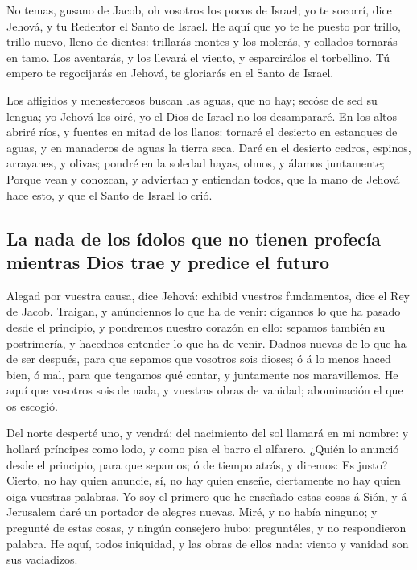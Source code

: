  No temas, gusano de Jacob, oh vosotros los pocos de
Israel; yo te socorrí, dice Jehová, y tu Redentor el Santo de Israel.
 He aquí que yo te he puesto por trillo, trillo nuevo,
lleno de dientes: trillarás montes y los molerás, y collados tornarás en
tamo.  Los aventarás, y los llevará el viento, y
esparcirálos el torbellino. Tú empero te regocijarás en Jehová, te
gloriarás en el Santo de Israel.

 Los afligidos y menesterosos buscan las aguas, que no hay;
secóse de sed su lengua; yo Jehová los oiré, yo el Dios de Israel no los
desampararé.  En los altos abriré ríos, y fuentes en mitad
de los llanos: tornaré el desierto en estanques de aguas, y en manaderos
de aguas la tierra seca.  Daré en el desierto cedros,
espinos, arrayanes, y olivas; pondré en la soledad hayas, olmos, y
álamos juntamente;  Porque vean y conozcan, y adviertan y
entiendan todos, que la mano de Jehová hace esto, y que el Santo de
Israel lo crió.

\hypertarget{la-nada-de-los-uxeddolos-que-no-tienen-profecuxeda-mientras-dios-trae-y-predice-el-futuro}{%
\subsection{La nada de los ídolos que no tienen profecía mientras Dios
trae y predice el
futuro}\label{la-nada-de-los-uxeddolos-que-no-tienen-profecuxeda-mientras-dios-trae-y-predice-el-futuro}}

 Alegad por vuestra causa, dice Jehová: exhibid vuestros
fundamentos, dice el Rey de Jacob.  Traigan, y anúnciennos
lo que ha de venir: dígannos lo que ha pasado desde el principio, y
pondremos nuestro corazón en ello: sepamos también su postrimería, y
hacednos entender lo que ha de venir.  Dadnos nuevas de lo
que ha de ser después, para que sepamos que vosotros sois dioses; ó á lo
menos haced bien, ó mal, para que tengamos qué contar, y juntamente nos
maravillemos.  He aquí que vosotros sois de nada, y
vuestras obras de vanidad; abominación el que os escogió.

 Del norte desperté uno, y vendrá; del nacimiento del sol
llamará en mi nombre: y hollará príncipes como lodo, y como pisa el
barro el alfarero.  ¿Quién lo anunció desde el principio,
para que sepamos; ó de tiempo atrás, y diremos: Es justo? Cierto, no hay
quien anuncie, sí, no hay quien enseñe, ciertamente no hay quien oiga
vuestras palabras.  Yo soy el primero que he enseñado estas
cosas á Sión, y á Jerusalem daré un portador de alegres nuevas.
 Miré, y no había ninguno; y pregunté de estas cosas, y
ningún consejero hubo: preguntéles, y no respondieron palabra.
 He aquí, todos iniquidad, y las obras de ellos nada:
viento y vanidad son sus vaciadizos.

